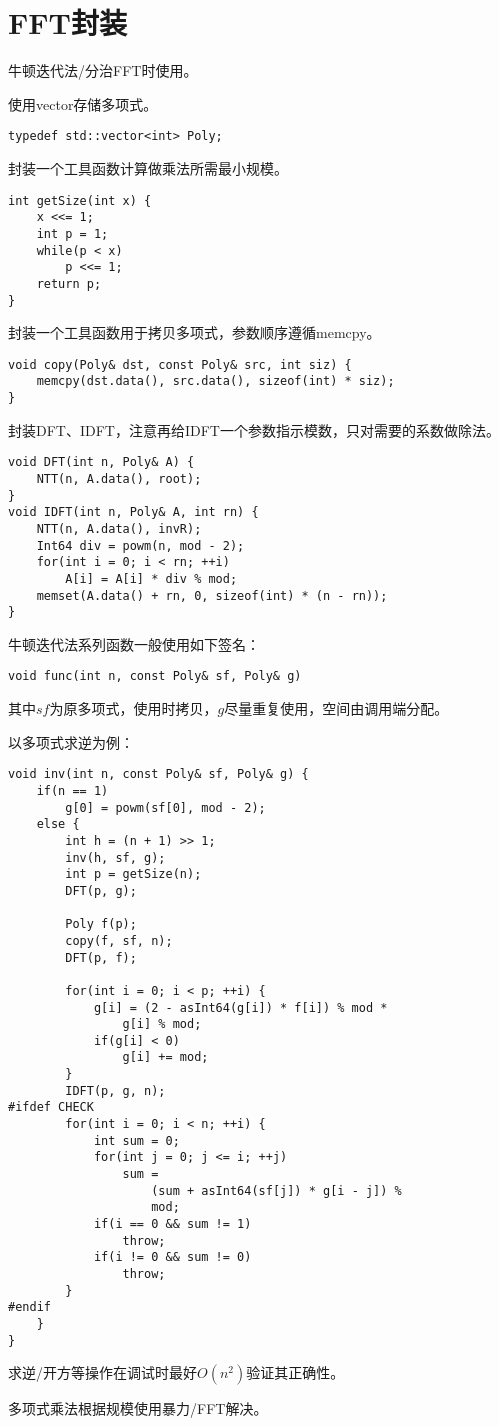 \section{FFT封装}
牛顿迭代法/分治FFT时使用。

使用vector存储多项式。
\begin{lstlisting}
typedef std::vector<int> Poly;
\end{lstlisting}

封装一个工具函数计算做乘法所需最小规模。
\begin{lstlisting}
int getSize(int x) {
    x <<= 1;
    int p = 1;
    while(p < x)
        p <<= 1;
    return p;
}
\end{lstlisting}

封装一个工具函数用于拷贝多项式，参数顺序遵循memcpy。
\begin{lstlisting}
void copy(Poly& dst, const Poly& src, int siz) {
    memcpy(dst.data(), src.data(), sizeof(int) * siz);
}
\end{lstlisting}

封装DFT、IDFT，注意再给IDFT一个参数指示模数，只对需要的系数做除法。
\begin{lstlisting}
void DFT(int n, Poly& A) {
    NTT(n, A.data(), root);
}
void IDFT(int n, Poly& A, int rn) {
    NTT(n, A.data(), invR);
    Int64 div = powm(n, mod - 2);
    for(int i = 0; i < rn; ++i)
        A[i] = A[i] * div % mod;
    memset(A.data() + rn, 0, sizeof(int) * (n - rn));
}
\end{lstlisting}

牛顿迭代法系列函数一般使用如下签名：
\begin{lstlisting}
void func(int n, const Poly& sf, Poly& g)
\end{lstlisting}

其中$sf$为原多项式，使用时拷贝，$g$尽量重复使用，空间由调用端分配。

以多项式求逆为例：
\begin{lstlisting}
void inv(int n, const Poly& sf, Poly& g) {
    if(n == 1)
        g[0] = powm(sf[0], mod - 2);
    else {
        int h = (n + 1) >> 1;
        inv(h, sf, g);
        int p = getSize(n);
        DFT(p, g);

        Poly f(p);
        copy(f, sf, n);
        DFT(p, f);

        for(int i = 0; i < p; ++i) {
            g[i] = (2 - asInt64(g[i]) * f[i]) % mod *
                g[i] % mod;
            if(g[i] < 0)
                g[i] += mod;
        }
        IDFT(p, g, n);
#ifdef CHECK
        for(int i = 0; i < n; ++i) {
            int sum = 0;
            for(int j = 0; j <= i; ++j)
                sum =
                    (sum + asInt64(sf[j]) * g[i - j]) %
                    mod;
            if(i == 0 && sum != 1)
                throw;
            if(i != 0 && sum != 0)
                throw;
        }
#endif
    }
}
\end{lstlisting}

求逆/开方等操作在调试时最好$O(n^2)$验证其正确性。

多项式乘法根据规模使用暴力/FFT解决。
